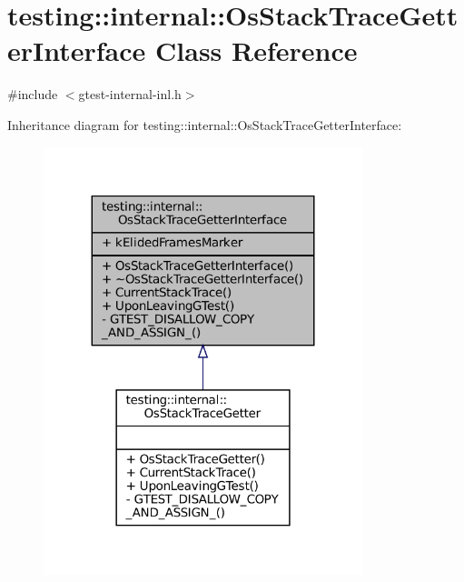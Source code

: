\hypertarget{classtesting_1_1internal_1_1OsStackTraceGetterInterface}{}\section{testing\+:\+:internal\+:\+:Os\+Stack\+Trace\+Getter\+Interface Class Reference}
\label{classtesting_1_1internal_1_1OsStackTraceGetterInterface}


{\ttfamily \#include $<$gtest-\/internal-\/inl.\+h$>$}



Inheritance diagram for testing\+:\+:internal\+:\+:Os\+Stack\+Trace\+Getter\+Interface\+:
\nopagebreak
\begin{figure}[H]
\begin{center}
\leavevmode
\includegraphics[width=263pt]{classtesting_1_1internal_1_1OsStackTraceGetterInterface__inherit__graph}
\end{center}
\end{figure}


